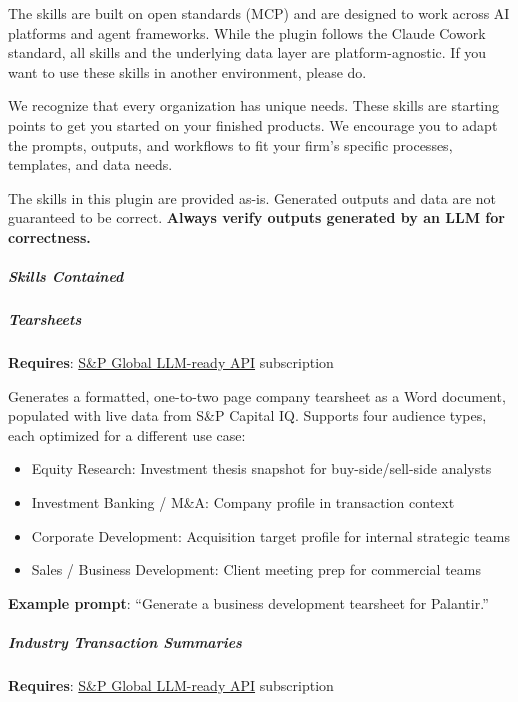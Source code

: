 \documentclass[11pt]{article}
\begin{document}
The skills are built on open standards (MCP) and are designed to work across AI platforms and agent frameworks. While the plugin follows the Claude Cowork standard, all skills and the underlying data layer are platform-agnostic. If you want to use these skills in another environment, please do.


We recognize that every organization has unique needs. These skills are starting points to get you started on your finished products. We encourage you to adapt the prompts, outputs, and workflows to fit your firm's specific processes, templates, and data needs.


The skills in this plugin are provided as-is. Generated outputs and data are not guaranteed to be correct. \textbf{Always verify outputs generated by an LLM for correctness.}


\subparagraph{Skills Contained}\mbox{}\par

\subparagraph{Tearsheets}\mbox{}\par
\textbf{Requires}: \href{https://www.marketplace.spglobal.com/en/solutions/kensho-llm-ready-api-\%28a156fe9f-5564-4f60-a624-95d8645dc98f\%29}{S\&P Global LLM-ready API} subscription


Generates a formatted, one-to-two page company tearsheet as a Word document, populated with live data from S\&P Capital IQ. Supports four audience types, each optimized for a different use case:

\begin{itemize}[leftmargin=*,itemsep=2pt,topsep=2pt]
\item {} Equity Research: Investment thesis snapshot for buy-side/sell-side analysts
\item {} Investment Banking / M\&A: Company profile in transaction context
\item {} Corporate Development: Acquisition target profile for internal strategic teams
\item {} Sales / Business Development: Client meeting prep for commercial teams
\end{itemize}

\textbf{Example prompt}: ``Generate a business development tearsheet for Palantir.''


\subparagraph{Industry Transaction Summaries}\mbox{}\par
\textbf{Requires}: \href{https://www.marketplace.spglobal.com/en/solutions/kensho-llm-ready-api-\%28a156fe9f-5564-4f60-a624-95d8645dc98f\%29}{S\&P Global LLM-ready API} subscription
\end{document}
